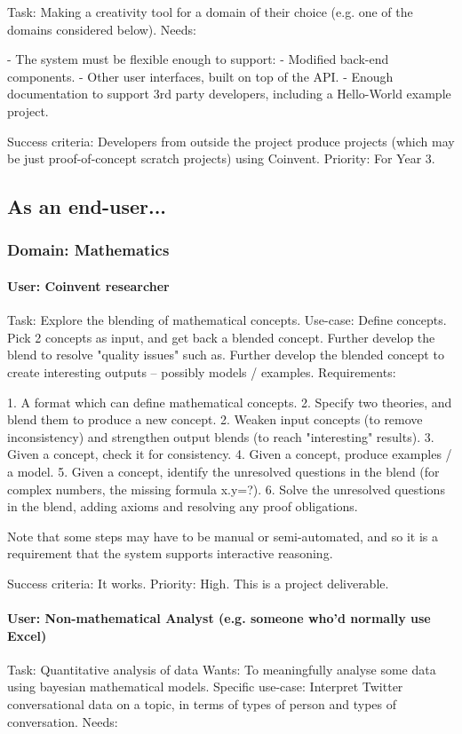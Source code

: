 \documentclass[10pt]{article}
\begin{document}
\begin{appendices}
Task: Making a creativity tool for a domain of their choice (e.g. one of the domains considered below).      
Needs: 

 - The system must be flexible enough to support:
   - Modified back-end components.
   - Other user interfaces, built on top of the API. 
 - Enough documentation to support 3rd party developers, including a Hello-World example project.      

Success criteria: Developers from outside the project produce projects (which may be just proof-of-concept scratch projects) using Coinvent.   
Priority: For Year 3.

\subsection{As an end-user...}

\subsubsection{Domain: Mathematics}

\paragraph{User: Coinvent researcher}
Task: Explore the blending of mathematical concepts.      
Use-case: Define concepts. Pick 2 concepts as input, and get back a blended concept. Further develop the blend to resolve "quality issues" such as.
Further develop the blended concept to create interesting outputs -- possibly models / examples.   
Requirements: 

1. A format which can define mathematical concepts.
2. Specify two theories, and blend them to produce a new concept.
2. Weaken input concepts (to remove inconsistency) and strengthen output blends (to reach "interesting" results). 
3. Given a concept, check it for consistency.
4. Given a concept, produce examples / a model.
5. Given a concept, identify the unresolved questions in the blend (for complex numbers, the missing formula x.y=?).
6. Solve the unresolved questions in the blend, adding axioms and resolving any proof obligations.

Note that some steps may have to be manual or semi-automated, and so it is a requirement that the
system supports interactive reasoning.

Success criteria: It works.       
Priority: High. This is a project deliverable.
 
 
\paragraph{User: Non-mathematical Analyst (e.g. someone who'd normally use Excel)}    
Task: Quantitative analysis of data   
Wants: To meaningfully analyse some data using bayesian mathematical models.   
Specific use-case: Interpret Twitter conversational data on a topic, in terms of types of person and types of conversation.   
Needs:


\end{appendices}
\end{document}
